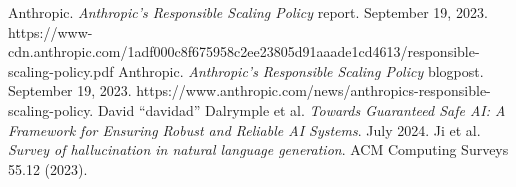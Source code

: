 \documentclass[twocolumn]{article}
\begin{document}
\begin{thebibliography}{10}
\footnotesize
 Anthropic. {\em Anthropic's Responsible Scaling Policy} report. September 19, 2023. https://www-cdn.anthropic.com/1adf000c8f675958c2ee23805d91aaade1cd4613/responsible-scaling-policy.pdf
 Anthropic. {\em Anthropic's Responsible Scaling Policy} blogpost. September 19, 2023. https://www.anthropic.com/news/anthropics-responsible-scaling-policy.
 David ``davidad'' Dalrymple et al. {\em Towards Guaranteed Safe AI: A Framework for Ensuring Robust and Reliable AI Systems}. July 2024.
 Ji et al. {\em Survey of hallucination in natural language generation}. ACM Computing Surveys 55.12 (2023).

\end{thebibliography}
\end{document}
